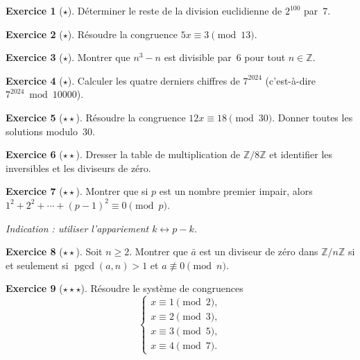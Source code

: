 \documentclass[12pt,a4paper,openany]{book}
\theoremstyle{definition}
\newtheorem{exercice}{Exercice}[chapter]
\theoremstyle{plain}
\theoremstyle{remark}
\newcommand{\Z}{\mathbb{Z}}
\DeclareMathOperator{\pgcd}{pgcd}
\begin{document}
\begin{exercice}[$\star$]
\label{exo:cong-1}
Déterminer le reste de la division euclidienne de $2^{100}$ par~$7$.
\end{exercice}

\begin{exercice}[$\star$]
\label{exo:cong-2}
Résoudre la congruence $5x \equiv 3 \pmod{13}$.
\end{exercice}

\begin{exercice}[$\star$]
\label{exo:cong-3}
Montrer que $n^3 - n$ est divisible par~$6$ pour tout $n \in \Z$.
\end{exercice}

\begin{exercice}[$\star$]
\label{exo:cong-4}
Calculer les quatre derniers chiffres de $7^{2024}$ (c'est-à-dire $7^{2024} \bmod 10000$).
\end{exercice}

\begin{exercice}[$\star\star$]
\label{exo:cong-5}
Résoudre la congruence $12x \equiv 18 \pmod{30}$. Donner toutes les solutions modulo~$30$.
\end{exercice}

\begin{exercice}[$\star\star$]
\label{exo:cong-6}
\index{Z/nZ@$\Z/n\Z$!structure}
Dresser la table de multiplication de $\Z/8\Z$ et identifier les inversibles
et les diviseurs de zéro.
\end{exercice}

\begin{exercice}[$\star\star$]
\label{exo:cong-7}
Montrer que si $p$ est un nombre premier impair, alors
$1^2 + 2^2 + \cdots + (p-1)^2 \equiv 0 \pmod{p}$.

\emph{Indication : utiliser l'appariement $k \leftrightarrow p - k$.}
\end{exercice}

\begin{exercice}[$\star\star$]
\label{exo:cong-8}
Soit $n \geqslant 2$. Montrer que $\bar{a}$ est un diviseur de zéro dans $\Z/n\Z$
si et seulement si $\pgcd(a, n) > 1$ et $a \not\equiv 0 \pmod{n}$.
\end{exercice}

\begin{exercice}[$\star\star\star$]
\label{exo:cong-9}
Résoudre le système de congruences
\[
  \begin{cases}
    x \equiv 1 \pmod{2}, \\
    x \equiv 2 \pmod{3}, \\
    x \equiv 3 \pmod{5}, \\
    x \equiv 4 \pmod{7}.
  \end{cases}
\]
\end{exercice}
\end{document}
